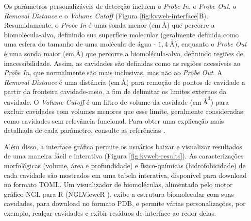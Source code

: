 \documentclass[Portugues]{phdquali}
\newcommand{\mAA}{~\text{\AA}}
\begin{document}
Os parâmetros personalizáveis de detecção incluem o \textit{Probe In}, o \textit{Probe Out}, o \textit{Removal Distance} e o \textit{Volume Cutoff} (Figura \ref{fig:kvweb-interface}B). Resumidamente, o \textit{Probe In} é uma sonda menor (em$\mAA$) que percorre a biomolécula-alvo, definindo sua superfície molecular (geralmente definida como uma esfera do tamanho de uma molécula de água - $1,4 \mAA$), enquanto o \textit{Probe Out} é uma sonda maior (em$\mAA$) que percorre a biomolécula-alvo, definindo regiões de inacessibilidade. Assim, as cavidades são definidas como as regiões acessíveis ao \textit{Probe In}, que normalmente são mais inclusivas, mas não ao \textit{Probe Out}. A \textit{Removal Distance} é uma distância (em$\mAA$) para remoção de pontos de cavidade a partir da fronteira cavidade-meio, a fim de delimitar os limites externos da cavidade. O \textit{Volume Cutoff} é um filtro de volume da cavidade (em$\mAA^3$) para excluir cavidades com volumes menores que esse limite, geralmente consideradas como cavidades sem relevância funcional. Para obter uma explicação mais detalhada de cada parâmetro, consulte as referências \cite{oliveira2014,guerra2019,guerra2020,guerra2021,guerra2023A}.
 
Além disso, a interface gráfica permite os usuários baixar e visualizar resultados de uma maneira fácil e interativa (Figura \ref{fig:kvweb-results}). As caracterizações morfológicas (volume, área e profundidade) e físico-químicas (hidrofobicidade) de cada cavidade são mostrados em uma tabela interativa, disponível para download no formato TOML. Um visualizador de biomoléculas, alimentado pelo motor gráfico NGL para R (NGLVieweR \cite{nglviewerr}), exibe a estrutura biomolecular com suas cavidades, para download no formato PDB, e permite várias personalizações, por exemplo, realçar cavidades e exibir resíduos de interface ao redor delas.
\end{document}
